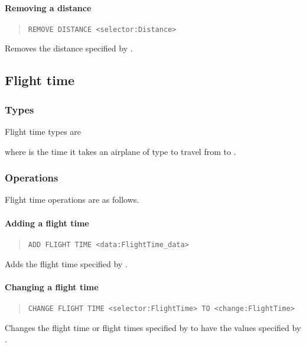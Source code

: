 \paragraph{Removing a distance}
\begin{quote}
  \lstinline{REMOVE DISTANCE <selector:Distance>}
\end{quote}
Removes the distance specified by .

\subsection{Flight time}
\subsubsection{Types}
Flight time types are
\begin{description}
  \item[] 
  \item[] 
\end{description}
where  is the time it takes an airplane of type 
to travel from  to .

\subsubsection{Operations}
Flight time operations are as follows.

\paragraph{Adding a flight time}
\begin{quote}
  \lstinline{ADD FLIGHT TIME <data:FlightTime_data>}
\end{quote}
Adds the flight time specified by .

\paragraph{Changing a flight time}
\begin{quote}
  \lstinline{CHANGE FLIGHT TIME <selector:FlightTime> TO <change:FlightTime>}
\end{quote}
Changes the flight time or flight times specified by  to have the
values specified by .

